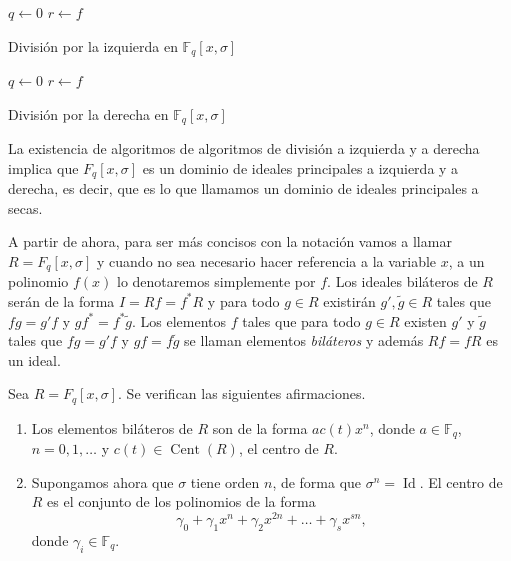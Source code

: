\begin{Ualgorithm}[h]
  \DontPrintSemicolon
  \(q \longleftarrow 0\)\;
  \(r \longleftarrow f\)\;
    \caption{División por la izquierda en \(\mathbb F_q[x, \sigma]\)}
  \label{alg:ore-fq-division-izquierda}
\end{Ualgorithm}

\begin{Ualgorithm}[h]
  \DontPrintSemicolon
  \(q \longleftarrow 0\)\;
  \(r \longleftarrow f\)\;
    \caption{División por la derecha en \(\mathbb F_q[x, \sigma]\)
  }
  \label{alg:ore-fq-division-derecha}
\end{Ualgorithm}

La existencia de algoritmos de algoritmos de división a izquierda y a derecha implica que \(F_q[x, \sigma]\) es un dominio de ideales principales a izquierda y a derecha, es decir, que es lo que llamamos un dominio de ideales principales a secas.

A partir de ahora, para ser más concisos con la notación vamos a llamar \(R = F_q[x, \sigma]\) y cuando no sea necesario hacer referencia a la variable \(x\), a un polinomio \(f(x)\) lo denotaremos simplemente por \(f\).
Los ideales biláteros de \(R\) serán de la forma \(I = Rf = f^{*}R\) y para todo \(g \in R\) existirán \(g', \tilde{g} \in R\) tales que \(fg = g'f\) y \(gf^{*} = f^{*}\tilde{g}\).
Los elementos \(f\) tales que para todo \(g \in R\) existen \(g'\) y \(\tilde{g}\) tales que \(fg = g'f\) y \(gf = f\tilde{g}\) se llaman elementos \emph{biláteros} y además \(Rf = fR\) es un ideal.

\begin{theorem}
  \label{th:anillos-ore-centro}
  Sea \(R = F_q[x, \sigma]\). Se verifican las siguientes afirmaciones.
  \begin{enumerate}
    \item Los elementos biláteros de \(R\) son de la forma \(ac(t)x^n\), donde \(a \in \mathbb F_q\), \(n = 0, 1, \dots\) y \(c(t) \in \operatorname{Cent}(R)\), el centro de \(R\).
    \item Supongamos ahora que \(\sigma\) tiene orden \(n\), de forma que \(\sigma^n = \operatorname{Id}\).
    El centro de \(R\) es el conjunto de los polinomios de la forma
    \[
      \gamma_0 + \gamma_1x^{n} + \gamma_2x^{2n} + \dots + \gamma_sx^{sn},
    \]
    donde \(\gamma_i \in \mathbb F_q\).
  \end{enumerate}
\end{theorem}

